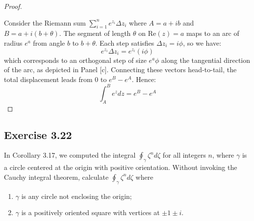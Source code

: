 \documentclass{article}
\begin{document}
\begin{proof}
\begin{center}
  \end{center}

  \vspace{1em}

  Consider the Riemann sum $\sum_{i=1}^{n} e^{z_i}\Delta z_i$ where
  $A = a+ib$ and $B = a+i(b+\theta)$. The segment of length
  $\theta$ on $\text{Re}(z) = a$ maps to an arc of radius $e^a$
  from angle $b$ to $b+\theta$. Each step satisfies $\Delta z_i =
  i\phi$, so we have:
  \[
    e^{z_i}\Delta z_i = e^{z_i}(i\phi)
  \]
  which corresponds to an orthogonal step of size $e^a\phi$ along
  the tangential direction of the arc, as depicted in Panel [c].
  Connecting these vectors head-to-tail, the total displacement
  leads from $0$ to $e^B - e^A$. Hence:
  \[
    \int_A^B e^z dz = e^B - e^A
  \]

\end{proof}

\subsection{Exercise 3.22}

In Corollary 3.17, we computed the integral $\oint_\gamma \zeta^n
d\zeta$ for all integers $n$, where $\gamma$ is a circle centered at
the origin with positive orientation. Without invoking the Cauchy
integral theorem, calculate $\oint_\gamma \zeta^n d\zeta$ where
\begin{enumerate}
  \item[(a)] $\gamma$ is any circle not enclosing the origin;
  \item[(b)] $\gamma$ is a positively oriented square with vertices
    at $\pm 1 \pm i$.
\end{enumerate}
\end{document}
